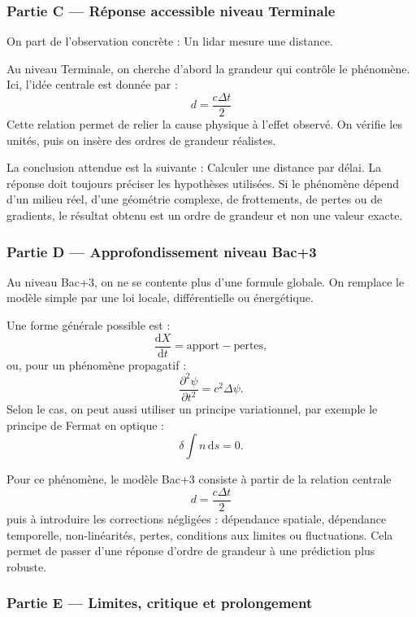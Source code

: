 \documentclass[11pt,a4paper]{article}
\begin{document}
\subsubsection*{Partie C — Réponse accessible niveau Terminale}

\begin{corrigebox}
On part de l'observation concrète : Un lidar mesure une distance.

Au niveau Terminale, on cherche d'abord la grandeur qui contrôle le phénomène. Ici, l'idée centrale est donnée par :
\[
d=\frac{c\Delta t}{2}
\]
Cette relation permet de relier la cause physique à l'effet observé. On vérifie les unités, puis on insère des ordres de grandeur réalistes.

La conclusion attendue est la suivante : Calculer une distance par délai. La réponse doit toujours préciser les hypothèses utilisées. Si le phénomène dépend d'un milieu réel, d'une géométrie complexe, de frottements, de pertes ou de gradients, le résultat obtenu est un ordre de grandeur et non une valeur exacte.
\end{corrigebox}

\subsubsection*{Partie D — Approfondissement niveau Bac+3}

\begin{approfondissementbox}
Au niveau Bac+3, on ne se contente plus d'une formule globale. On remplace le modèle simple par une loi locale, différentielle ou énergétique.

Une forme générale possible est :
\[
\frac{\mathrm d X}{\mathrm dt}=\text{apport}-\text{pertes},
\]
ou, pour un phénomène propagatif :
\[
\frac{\partial^2 \psi}{\partial t^2}=c^2\Delta\psi.
\]
Selon le cas, on peut aussi utiliser un principe variationnel, par exemple le principe de Fermat en optique :
\[
\delta \int n\,\mathrm ds=0.
\]

Pour ce phénomène, le modèle Bac+3 consiste à partir de la relation centrale
\[
d=\frac{c\Delta t}{2}
\]
puis à introduire les corrections négligées : dépendance spatiale, dépendance temporelle, non-linéarités, pertes, conditions aux limites ou fluctuations. Cela permet de passer d'une réponse d'ordre de grandeur à une prédiction plus robuste.
\end{approfondissementbox}

\subsubsection*{Partie E — Limites, critique et prolongement}
\end{document}
